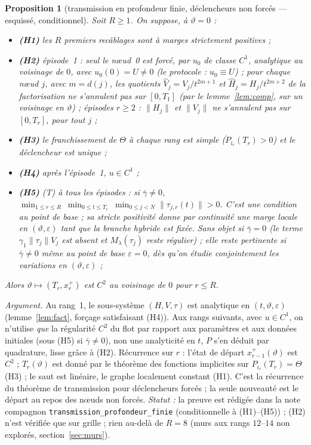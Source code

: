 \documentclass[11pt,a4paper]{article}
\newtheorem{proposition}{Proposition}
\theoremstyle{remark}
\newcommand{\vth}{\vartheta}
\begin{document}
\begin{proposition}[transmission en profondeur finie, d\'eclencheurs non forc\'es --- esquiss\'e, conditionnel]\label{prop:fini}
Soit $R\ge1$. On suppose, \`a $\vth=0$ :
\begin{itemize}[leftmargin=1.6em,itemsep=1pt]
\item \textbf{(H1)} les $R$ premiers recâblages sont \`a marges strictement positives ;
\item \textbf{(H2)} \emph{\'episode~1} : seul le n\oe ud~0 est forc\'e, par $u_0$ de classe $C^1$, analytique au voisinage de $0$, avec $u_0(0)=U\neq0$ (le protocole : $u_0\equiv U$) ; \emph{pour chaque n\oe ud $j$}, avec $m=d(j)$, les quotients $\hat V_j=V_j/t^{2m+1}$ et $\hat H_j=H_j/t^{2m+2}$ de la factorisation ne s'annulent pas sur $[0,T_1]$ (par le lemme~\ref{lem:comp}, sur un voisinage en $\vth$) ; \emph{\'episodes $r\ge2$} : $\lVert H_j\rVert$ et $\lVert V_j\rVert$ ne s'annulent pas sur $[0,T_r]$, pour tout $j$ ;
\item \textbf{(H3)} le franchissement de $\Theta$ \`a chaque rang est simple ($\dot P_{i_r}(T_r)>0$) et le d\'eclencheur est unique ;
\item \textbf{(H4)} apr\`es l'\'episode~1, $u\in C^1$ ;
\item \textbf{(H5)} (T) \`a \emph{tous} les \'episodes : si $\bar\gamma\neq0$, $\displaystyle\min_{1\le r\le R}\ \min_{0\le t\le T_r}\ \min_{0\le j<N}\lVert\tau_{j,r}(t)\rVert>0$. C'est une condition au point de base ; sa stricte positivit\'e donne par continuit\'e une marge locale en $(\vth,\varepsilon)$ tant que la branche hybride est fix\'ee. Sans objet si $\bar\gamma=0$ (le terme $\gamma_1\lVert\tau_j\rVert V_j$ est absent et $M_\lambda(\tau_j)$ reste r\'egulier) ; elle reste pertinente si $\bar\gamma\neq0$ m\^eme au point de base $\varepsilon=0$, d\`es qu'on \'etudie conjointement les variations en $(\vth,\varepsilon)$ ;
\end{itemize}
Alors $\vth\mapsto(T_r,x_r^+)$ est $C^2$ au voisinage de $0$ pour $r\le R$.
\end{proposition}
\noindent\emph{Argument.} Au rang~1, le sous-syst\`eme $(H,V,\tau)$ est analytique en $(t,\vth,\varepsilon)$ (lemme~\ref{lem:fact}, for\c{c}age satisfaisant (H4)). Aux rangs suivants, avec $u\in C^1$, on n'utilise \emph{que} la r\'egularit\'e $C^2$ du flot par rapport aux param\`etres et aux donn\'ees initiales (sous (H5) si $\bar\gamma\neq0$), non une analyticit\'e en $t$, $P$ s'en d\'eduit par quadrature, lisse gr\^ace \`a (H2). R\'ecurrence sur $r$ : l'\'etat de d\'epart $x_{r-1}^+(\vth)$ est $C^2$ ; $T_r(\vth)$ est donn\'e par le th\'eor\`eme des fonctions implicites sur $P_{i_r}(T_r)=\Theta$ (H3) ; le saut est lin\'eaire, le graphe localement constant (H1). C'est la r\'ecurrence du th\'eor\`eme de transmission pour d\'eclencheurs forc\'es ; la seule nouveaut\'e est le d\'epart au repos des n\oe uds non forc\'es. \emph{Statut :} la preuve est r\'edig\'ee dans la note compagnon \texttt{transmission\_profondeur\_finie} (conditionnelle \`a (H1)--(H5)) ; (H2) n'est v\'erifi\'ee que sur grille ; rien au-del\`a de $R=8$ (murs aux rangs $12$--$14$ non explor\'es, section~\ref{sec:murs}).
\end{document}
